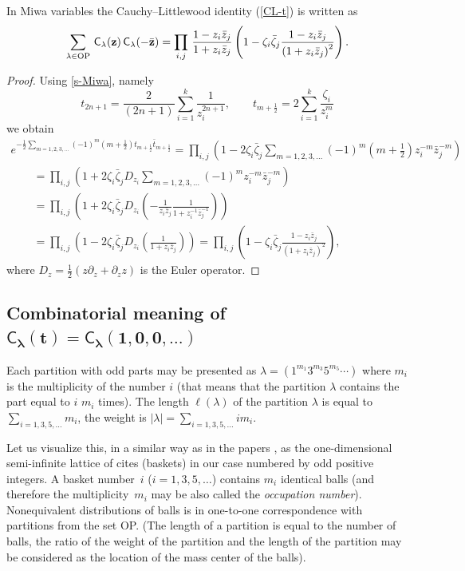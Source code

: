 \documentclass[pdftex]{sigma}
\numberwithin{equation}{section}
\begin{document}
In Miwa variables the Cauchy--Littlewood identity (\ref{CL-t}) is written as
\[
\sum_{\lambda\in
\mathrm{OP}}\,\textsf{C}_\lambda({\bf z})\, \textsf{C}_\lambda(-{\bar{\bf
z}})=
\prod_{i,j}\,\frac{1-z_i{\bar z}_j}{1+z_i{\bar
z}_j}
\left(1-
\zeta_i{\bar{\zeta}_j} \frac{1-z_i{\bar z}_j}{\left(1+z_i{\bar z}_j\right)^2} \right).
\]
\begin{proof} Using \eqref{s-Miwa}, namely
 \[
t_{2n+1}=\frac{2}{(2n+1)}\sum_{i=1}^k\frac 1{z_i^{2n+1}} ,\qquad
t_{m+\frac12} = 2\sum_{i=1}^k\frac{\zeta_i}{z_i^{m}}
  \]
we obtain
\begin{gather*}
e^{-\frac 12
\sum\limits_{m=1,2,3,\dots }  (-1)^{m}(m+\frac 12)t_{m+\frac 12}{\bar
t}_{m+\frac 12} } =
\prod_{i,j}
\left(1-2
\zeta_i{\bar{\zeta}_j}\sum\limits_{m=1,2,3,\dots }  (-1)^{m}\left(m+\frac 12\right)z_i^{-m}{\bar
z}_j^{-m} \right)
 \\
\qquad{}=\prod_{i,j}
\left(1+2
\zeta_i{\bar{\zeta}_j}D_{z_i}\sum\limits_{m=1,2,3,\dots }  (-1)^{m}z_i^{-m}{\bar
z}_j^{-m} \right)\\
\qquad{} =
\prod_{i,j}
\left(1+2
\zeta_i{\bar{\zeta}_j}D_{z_i}\left( -\frac{1}{z_i{\bar{z}_j}}\frac{1}{1+z_i^{-1}{\bar
z}_j^{-1}} \right) \right)
\\
\qquad{} =
\prod_{i,j}
\left(1-2
\zeta_i{\bar{\zeta}_j}D_{z_i}\left( \frac{1}{1+z_i{\bar
z}_j} \right) \right)=
\prod_{i,j}
\left(1-
\zeta_i{\bar{\zeta}_j} \frac{1-z_i{\bar z}_j}{\left(1+z_i{\bar z}_j\right)^2} \right),
\end{gather*}
where $D_z=\frac12(z\partial_z+\partial_z z)$ is the Euler operator.
\end{proof}


\subsection[Combinatorial meaning of $\textsf{C}_{\lambda}(t)=\textsf{C}_{\lambda}(1,0,0,\dots)$]{Combinatorial meaning of $\boldsymbol{\textsf{C}_{\lambda}(t)=\textsf{C}_{\lambda}(1,0,0,\dots)}$}

 Each partition with odd
parts may be presented as $\lambda=(1^{m_1}3^{m_3}5^{m_5}\cdots)$
where $m_i$ is the multiplicity of the number $i$ (that means that
the partition $\lambda$ contains the part equal to $i$  $m_i$
times). The length $\ell(\lambda)$ of the partition $\lambda$ is
equal to $\sum\limits_{i=1,3,5,\dots}m_i$, the weight is
$|\lambda|=\sum\limits_{i=1,3,5,\dots} i m_i$.

Let us visualize this, in a similar way as in the papers \cite{HO,LO}, as the one-dimensional semi-inf\/inite lattice
of cites (baskets) in our case numbered by odd positive integers.
A basket number~$i$ ($i=1,3,5,\dots$) contains $m_i$ identical
balls (and therefore the multiplicity~$m_i$ may be also called the
{\em occupation number}). Nonequivalent distributions of balls is
in one-to-one correspondence with partitions from the set OP.
(The length of a partition is equal to the number of balls, the
ratio of the weight of the partition and the length of the
partition may be considered as the location of the mass center of
the balls).
\end{document}
